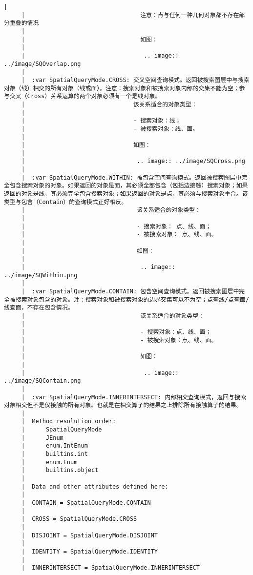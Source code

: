 \documentclass[11pt]{article}
\begin{document}
\begin{Verbatim}[commandchars=\\\{\}]
     |  
     |                                 注意：点与任何一种几何对象都不存在部分重叠的情况
     |  
     |                                 如图：
     |  
     |                                  .. image:: ../image/SQOverlap.png
     |  
     |  :var SpatialQueryMode.CROSS: 交叉空间查询模式。返回被搜索图层中与搜索对象（线）相交的所有对象（线或面）。注意：搜索对象和被搜索对象内部的交集不能为空；参与交叉（Cross）关系运算的两个对象必须有一个是线对象。
     |                               该关系适合的对象类型：
     |  
     |                               - 搜索对象：线；
     |                               - 被搜索对象：线、面。
     |  
     |                               如图：
     |  
     |                                .. image:: ../image/SQCross.png
     |  
     |  :var SpatialQueryMode.WITHIN: 被包含空间查询模式。返回被搜索图层中完全包含搜索对象的对象。如果返回的对象是面，其必须全部包含（包括边接触）搜索对象；如果返回的对象是线，其必须完全包含搜索对象；如果返回的对象是点，其必须与搜索对象重合。该类型与包含（Contain）的查询模式正好相反。
     |                                该关系适合的对象类型：
     |  
     |                                - 搜索对象： 点、线、面；
     |                                - 被搜索对象： 点、线、面。
     |  
     |                                如图：
     |  
     |                                 .. image:: ../image/SQWithin.png
     |  
     |  :var SpatialQueryMode.CONTAIN: 包含空间查询模式。返回被搜索图层中完全被搜索对象包含的对象。注：搜索对象和被搜索对象的边界交集可以不为空；点查线/点查面/线查面，不存在包含情况。
     |                                 该关系适合的对象类型：
     |  
     |                                 - 搜索对象：点、线、面；
     |                                 - 被搜索对象：点、线、面。
     |  
     |                                 如图：
     |  
     |                                  .. image:: ../image/SQContain.png
     |  
     |  :var SpatialQueryMode.INNERINTERSECT: 内部相交查询模式，返回与搜索对象相交但不是仅接触的所有对象。也就是在相交算子的结果之上排除所有接触算子的结果。
     |  
     |  Method resolution order:
     |      SpatialQueryMode
     |      JEnum
     |      enum.IntEnum
     |      builtins.int
     |      enum.Enum
     |      builtins.object
     |  
     |  Data and other attributes defined here:
     |  
     |  CONTAIN = SpatialQueryMode.CONTAIN
     |  
     |  CROSS = SpatialQueryMode.CROSS
     |  
     |  DISJOINT = SpatialQueryMode.DISJOINT
     |  
     |  IDENTITY = SpatialQueryMode.IDENTITY
     |  
     |  INNERINTERSECT = SpatialQueryMode.INNERINTERSECT

\end{Verbatim}
\end{document}
